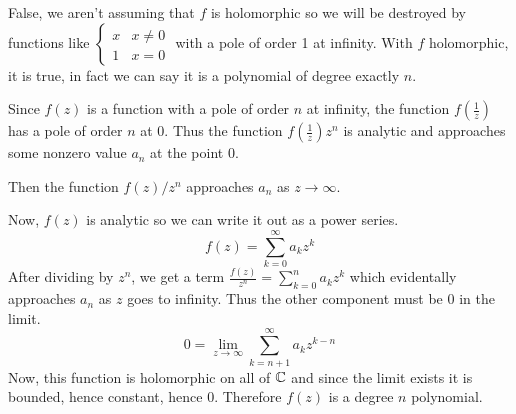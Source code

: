 \documentclass{homework}
\begin{document}
                                                                                                                                \begin{solution}
                                                                                                                                False, we aren't assuming that $f$ is holomorphic so we will be destroyed by functions like $\begin{cases}x&x\neq 0\\ 1 &x=0\end{cases}$ with a pole of order 1 at infinity. With $f$ holomorphic, it is true, in fact we can say it is a polynomial of degree exactly $n$.


                                                                                                                                Since $f(z)$ is a function with a pole of order $n$ at infinity, the function $f(\frac{1}{z})$ has a pole of order $n$ at 0. Thus the function $f(\frac{1}{z})z^n$ is analytic and approaches some nonzero value $a_n$ at the point 0.

                                                                                                                                Then the function $f(z)/z^n$ approaches $a_n$ as $z\to \infty$.

                                                                                                                                Now, $f(z)$ is analytic so we can write it out as a power series.
                                                                                                                                \[
                                                                                                                                f(z) = \sum_{k=0}^\infty a_kz^k
                                                                                                                                \]
                                                                                                                                After dividing by $z^n$, we get a term $\frac{f(z)}{z^n} = \sum_{k=0}^n a_kz^k$ which evidentally approaches $a_n$ as $z$ goes to infinity. Thus the other component must be 0 in the limit.
                                                                                                                                \[
                                                                                                                                0 = \lim_{z\to\infty} \sum_{k=n+1}^\infty a_kz^{k-n}
                                                                                                                                \]
                                                                                                                                Now, this function is holomorphic on all of $\mathbb{C}$ and since the limit exists it is bounded, hence constant, hence 0. Therefore $f(z)$ is a degree $n$ polynomial.

                                                                                                                                \end{solution}
\end{document}
